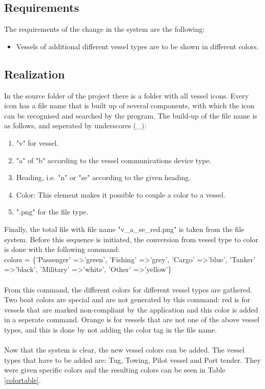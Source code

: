 \documentclass[12pt]{article}
\begin{document}
\subsection*{Requirements}
The requirements of the change in the system are the following:
\begin{itemize}
\item Vessels of additional different vessel types are to be shown in different colors.
\end{itemize}
\subsection*{Realization}
In the source folder of the project there is a folder with all vessel icons. Every icon has a file name that is built up of several components, with which the icon can be recognised and searched by the program. The build-up of the file name is as follows, and seperated by underscores (\_):
\\
\begin{enumerate}
\item "v" for vessel.
\item "a" of "b" according to the vessel communications device type.
\item Heading, i.e. "n" or "se" according to the given heading.
\item Color: This element makes it possible to couple a color to a vessel.
\item ".png" for the file type.
\end{enumerate}

Finally, the total file with file name "v\_a\_se\_red.png" is taken from the file system. Before this sequence is initiated, the conversion from vessel type to color is done with the following command:
\\
    colors = \{'Passenger' =\textgreater 'green', 'Fishing' =\textgreater 'grey', 'Cargo' =\textgreater 'blue', 'Tanker' =\textgreater 'black', 'Military' =\textgreater 'white', 'Other' =\textgreater 'yellow'\}
\\
\\
From this command, the different colors for different vessel types are gathered. Two boat colors are special and are not generated by this command: red is for vessels that are marked non-compliant by the application and this color is added in a seperate command. Orange is for vessels that are not one of the above vessel types, and this is done by not adding the color tag in the file name.
\\
\\
Now that the system is clear, the new vessel colors can be added. The vessel types that have to be added are: Tug, Towing, Pilot vessel and Port tender. They were given specific colors and the resulting colors can be seen in Table \ref{colortable}.
\\
\end{document}
